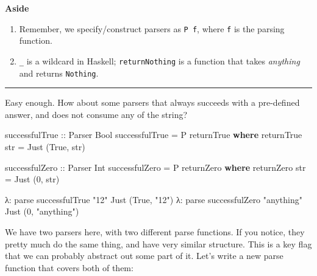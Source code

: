 \documentclass[]{article}
\newenvironment{Shaded}{}{}
\newcommand{\DataTypeTok}[1]{\textcolor[rgb]{0.56,0.13,0.00}{#1}}
\newcommand{\DecValTok}[1]{\textcolor[rgb]{0.25,0.63,0.44}{#1}}
\newcommand{\KeywordTok}[1]{\textcolor[rgb]{0.00,0.44,0.13}{\textbf{#1}}}
\newcommand{\NormalTok}[1]{#1}
\newcommand{\OperatorTok}[1]{\textcolor[rgb]{0.40,0.40,0.40}{#1}}
\newcommand{\OtherTok}[1]{\textcolor[rgb]{0.00,0.44,0.13}{#1}}
\newcommand{\StringTok}[1]{\textcolor[rgb]{0.25,0.44,0.63}{#1}}
\begin{document}
\textbf{Aside}

\begin{enumerate}
\def\labelenumi{\arabic{enumi}.}
\tightlist
\item
  Remember, we specify/construct parsers as \texttt{P\ f}, where \texttt{f} is
  the parsing function.
\item
  \texttt{\_} is a wildcard in Haskell; \texttt{returnNothing} is a function
  that takes \emph{anything} and returns \texttt{Nothing}.
\end{enumerate}

\begin{center}\rule{0.5\linewidth}{0.5pt}\end{center}

Easy enough. How about some parsers that always succeeds with a pre-defined
answer, and does not consume any of the string?

\begin{Shaded}
\begin{Highlighting}[]
\OtherTok{successfulTrue ::} \DataTypeTok{Parser} \DataTypeTok{Bool}
\NormalTok{successfulTrue }\OtherTok{=} \DataTypeTok{P}\NormalTok{ returnTrue}
    \KeywordTok{where}
\NormalTok{        returnTrue str }\OtherTok{=} \DataTypeTok{Just}\NormalTok{ (}\DataTypeTok{True}\NormalTok{, str)}

\OtherTok{successfulZero ::} \DataTypeTok{Parser} \DataTypeTok{Int}
\NormalTok{successfulZero }\OtherTok{=} \DataTypeTok{P}\NormalTok{ returnZero}
    \KeywordTok{where}
\NormalTok{        returnZero str }\OtherTok{=} \DataTypeTok{Just}\NormalTok{ (}\DecValTok{0}\NormalTok{, str)}
\end{Highlighting}
\end{Shaded}

\begin{Shaded}
\begin{Highlighting}[]
\NormalTok{λ}\OperatorTok{:}\NormalTok{ parse successfulTrue }\StringTok{"12"}
\DataTypeTok{Just}\NormalTok{ (}\DataTypeTok{True}\NormalTok{, }\StringTok{"12"}\NormalTok{)}
\NormalTok{λ}\OperatorTok{:}\NormalTok{ parse successfulZero }\StringTok{"anything"}
\DataTypeTok{Just}\NormalTok{ (}\DecValTok{0}\NormalTok{, }\StringTok{"anything"}\NormalTok{)}
\end{Highlighting}
\end{Shaded}

We have two parsers here, with two different parse functions. If you notice,
they pretty much do the same thing, and have very similar structure. This is a
key flag that we can probably abstract out some part of it. Let's write a new
parse function that covers both of them:
\end{document}
